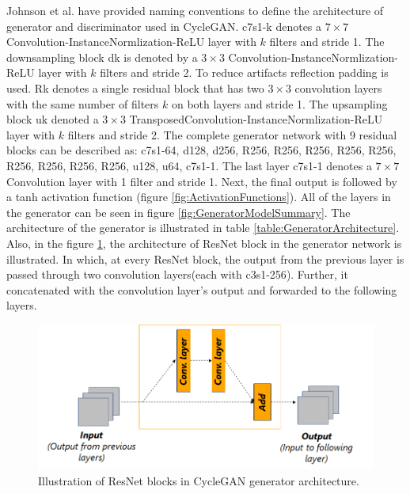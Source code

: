 Johnson et al.\cite{johnson2016perceptual} have provided naming conventions to define the architecture of generator and discriminator used in \ac{CycleGAN}. {\selectfont c7s1-k} denotes a $7 \times 7$ Convolution-InstanceNormlization-ReLU layer with $k$ filters and stride 1. The downsampling block {\selectfont dk} is denoted by a $3 \times 3$ Convolution-InstanceNormlization-ReLU layer with $k$ filters and stride 2. To reduce artifacts reflection padding is used. {\selectfont Rk} denotes a single residual block that has two $3 \times 3$ convolution layers with the same number of filters $k$ on both layers and stride 1. The upsampling block {\selectfont uk} denoted a $3 \times 3$ TransposedConvolution-InstanceNormlization-ReLU layer with $k$ filters and stride 2. The complete generator network with 9 residual blocks can be described as: {\selectfont c7s1-64, d128, d256, R256, R256, R256, R256, R256, R256, R256, R256, R256, u128, u64, c7s1-1}. The last layer {\selectfont c7s1-1} denotes a $7 \times 7$ Convolution layer with 1 filter and stride 1. Next, the final output is followed by a tanh activation function (figure \ref{fig:ActivationFunctions}). All of the layers in the generator can be seen in figure \ref{fig:GeneratorModelSummary}. The architecture of the generator is illustrated in table \ref{table:GeneratorArchitecture}. Also, in the figure \ref{fig:resnetBlock}, the architecture of \ac{ResNet} block in the generator network is illustrated. In which, at every \ac{ResNet} block, the output from the previous layer is passed through two convolution layers(each with {\selectfont c3s1-256}). Further, it concatenated with the convolution layer's output and forwarded to the following layers.


\vspace*{1.0cm}
\begin{figure}[H]
        \begin{center}
	    \includegraphics[scale=0.65]{images/Implementation/resnetBlocks.png}
	    \caption[Illustration of ResNet blocks in \ac{CycleGAN} generator architecture.]{Illustration of ResNet blocks in \ac{CycleGAN} generator architecture.}
	    \label{fig:resnetBlock}
	    \end{center}
\end{figure}


